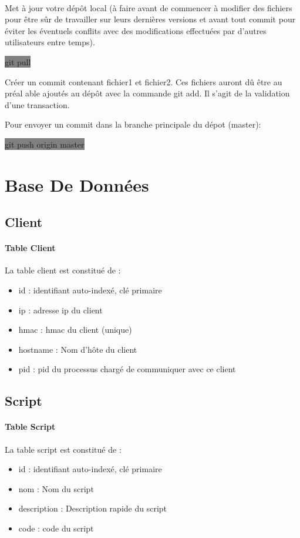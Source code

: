 \documentclass[11pt,a4paper,titlepage, oneside]{article}
\begin{document}
		\paragraph{}
			Met à jour votre dépôt local (à faire avant de commencer à modifier des fichiers pour être sûr de travailler sur leurs dernières versions et avant tout commit pour éviter les éventuels conflits avec des modifications effectuées par d'autres utilisateurs entre temps). 

			\colorbox{gray}{git pull}

			Créer un commit contenant fichier1 et fichier2. Ces fichiers auront dû être au préal able ajoutés au dépôt avec la commande git add. Il s'agit de la validation d'une transaction. 

			Pour envoyer un commit dans la branche principale du dépot (master):
			
			\colorbox{gray}{git push origin master}	

\newpage
\section{{\color{red} Base De Données}}
	\subsection{{\color{blue}Client}}
		\paragraph{Table Client}
			La table client est constitué de :
			\begin{itemize}
				\item id : identifiant auto-indexé, clé primaire
				\item ip : adresse ip du client
				\item hmac : hmac du client (unique)
				\item hostname : Nom d'hôte du client
				\item pid : pid du processus chargé de communiquer avec ce client
			\end{itemize}
	\subsection{{\color{blue} Script}}
		\paragraph{Table Script}
			La table script est constitué de :
			\begin{itemize}
				\item id : identifiant auto-indexé, clé primaire
				\item nom : Nom du script
				\item description : Description rapide du script
				\item code : code du script
			\end{itemize}
		
\end{document}
